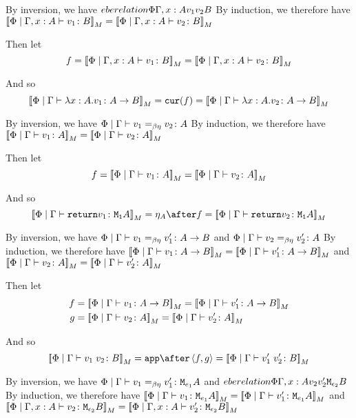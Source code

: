 \documentclass{report}
\begin{document}
    By inversion, we have $\\eberelation{\Phi}{\Gamma, x: A}{v_1}{v_2}{B}$
    By induction, we therefore have ${\bf [\![}\Phi\mid\Gamma, x: A \vdash v_1 \colon B{\bf ]\!]}_M = {\bf [\![}\Phi\mid\Gamma, x: A \vdash v_2 \colon B{\bf ]\!]}_M$

    Then let
    \begin{equation}
        f = {\bf [\![}\Phi\mid\Gamma, x: A \vdash v_1 \colon B{\bf ]\!]}_M = {\bf [\![}\Phi\mid\Gamma, x: A \vdash v_2 \colon B{\bf ]\!]}_M
    \end{equation}

    And so
    \begin{equation}
        {\bf [\![}\Phi\mid\Gamma \vdash \lambda x : A. v_1 \colon A\rightarrow B{\bf ]\!]}_M = \texttt{cur}(f) = {\bf [\![}\Phi\mid\Gamma \vdash \lambda x : A. v_2 \colon A\rightarrow B{\bf ]\!]}_M
    \end{equation}


By inversion, we have $\Phi\mid\Gamma \vdash v_1 =_{\beta\eta} v_2 \colon A$
By induction, we therefore have ${\bf [\![}\Phi\mid\Gamma \vdash v_1 \colon A{\bf ]\!]}_M = {\bf [\![}\Phi\mid\Gamma \vdash v_2 \colon A{\bf ]\!]}_M$

Then let
\begin{equation}
    f = {\bf [\![}\Phi\mid\Gamma \vdash v_1 \colon A{\bf ]\!]}_M = {\bf [\![}\Phi\mid\Gamma \vdash v_2 \colon A{\bf ]\!]}_M
\end{equation}

And so
\begin{equation}
    \deno{\gpetyperelation{\return{v_1}}{\M{\1}{A}}} = \point{A}\after f = \deno{\gpetyperelation{\return{v_2}}{\M{\1}{A}}}
\end{equation}


By inversion, we have $\Phi\mid\Gamma \vdash v_1 =_{\beta\eta} v_1' \colon A\rightarrow B$ and $\Phi\mid\Gamma \vdash v_2 =_{\beta\eta} v_2' \colon A$
By induction, we therefore have ${\bf [\![}\Phi\mid\Gamma \vdash v_1 \colon A\rightarrow B{\bf ]\!]}_M= {\bf [\![}\Phi\mid\Gamma \vdash v_1' \colon A\rightarrow B{\bf ]\!]}_M$ and ${\bf [\![}\Phi\mid\Gamma \vdash v_2 \colon A{\bf ]\!]}_M = {\bf [\![}\Phi\mid\Gamma \vdash v_2' \colon A{\bf ]\!]}_M$

Then let
\begin{align}
    f &{}= \deno{\gpetyperelation{v_1}{\ab}} = \deno{\gpetyperelation{v_1'}{\ab}}\\
    g &{}= \deno{\gpetyperelation{v_2}{A}} = \deno{\gpetyperelation{v_2'}{A}}
\end{align}



And so
\begin{equation}
    \deno{\gpetyperelation{\apply{v_1}{v_2}}{B}} = \app\after\pr{f}{g} = \deno{\gpetyperelation{\apply{v_1'}{v_2'}}{B}}
\end{equation}


By inversion, we have $\Phi\mid\Gamma \vdash v_1 =_{\beta\eta} v_1' \colon \texttt{M}_{e_1}{A}$ and $\\eberelation{\Phi}{\Gamma, x: A}{v_2}{v_2'}{\texttt{M}_{\epsilon_2}{B}}$
By induction, we therefore have ${\bf [\![}\Phi\mid\Gamma \vdash v_1 \colon \texttt{M}_{e_1}{A}{\bf ]\!]}_M= {\bf [\![}\Phi\mid\Gamma \vdash v_1' \colon \texttt{M}_{e_1}{A}{\bf ]\!]}_M$ and ${\bf [\![}\Phi\mid\Gamma, x: A \vdash v_2 \colon \texttt{M}_{\epsilon_2}{B}{\bf ]\!]}_M = {\bf [\![}\Phi\mid\Gamma, x: A \vdash v_2' \colon \texttt{M}_{\epsilon_2}{B}{\bf ]\!]}_M$
\end{document}
